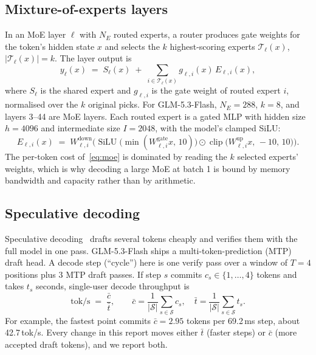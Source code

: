 \documentclass[11pt]{article}
\newcommand{\tps}{\,tok/s}
\newcommand{\ms}{\,ms}
\begin{document}
\subsection{Mixture-of-experts layers}
In an MoE layer $\ell$ with $N_E$ routed experts, a router produces gate weights for the token's hidden state $x$ and
selects the $k$ highest-scoring experts $\mathcal{T}_\ell(x)$, $|\mathcal{T}_\ell(x)| = k$. The layer output is
\begin{equation}
  y_\ell(x) \;=\; S_\ell(x) \;+\; \sum_{i \in \mathcal{T}_\ell(x)} g_{\ell,i}(x)\, E_{\ell,i}(x),
  \label{eq:moe}
\end{equation}
where $S_\ell$ is the shared expert and $g_{\ell,i}$ is the gate weight of routed expert $i$, normalised over the $k$
original picks. For GLM-5.3-Flash, $N_E = 288$, $k = 8$, and layers 3--44 are MoE layers. Each routed expert is a
gated MLP with hidden size $h = 4096$ and intermediate size $I = 2048$, with the model's clamped SiLU:
\begin{equation}
  E_{\ell,i}(x) \;=\; W^{\mathrm{down}}_{\ell,i}\Big(\operatorname{SiLU}\big(\min(W^{\mathrm{gate}}_{\ell,i}x,\,10)\big)
  \odot \operatorname{clip}\big(W^{\mathrm{up}}_{\ell,i}x,\,-10,\,10\big)\Big).
  \label{eq:expert}
\end{equation}
The per-token cost of~\eqref{eq:moe} is dominated by reading the $k$ selected experts' weights, which is why decoding a
large MoE at batch 1 is bound by memory bandwidth and capacity rather than by arithmetic.

\subsection{Speculative decoding}
Speculative decoding~\citep{specdec} drafts several tokens cheaply and verifies them with the full model in
one pass. GLM-5.3-Flash ships a multi-token-prediction (MTP) draft head. A decode step (``cycle'') here is one verify pass
over a window of $T = 4$ positions plus 3 MTP draft passes. If step $s$ commits $c_s \in \{1,\dots,4\}$ tokens and takes
$t_s$ seconds, single-user decode throughput is
\begin{equation}
  \text{tok/s} \;=\; \frac{\bar c}{\bar t}, \qquad \bar c = \frac{1}{|\mathcal{S}|}\sum_{s\in\mathcal{S}} c_s,\quad
  \bar t = \frac{1}{|\mathcal{S}|}\sum_{s\in\mathcal{S}} t_s .
  \label{eq:toks}
\end{equation}
For example, the fastest point commits $\bar c = 2.95$ tokens per 69.2\ms{} step, about 42.7\tps. Every change in this
report moves either $\bar t$ (faster steps) or $\bar c$ (more accepted draft tokens), and we report both.
\end{document}
